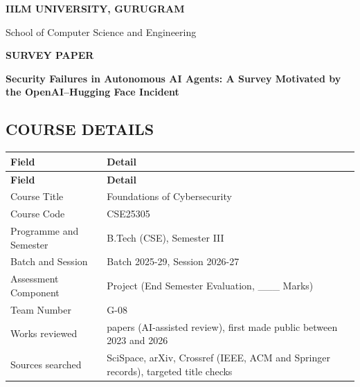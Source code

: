 \begin{center}
{\large\bfseries IILM UNIVERSITY, GURUGRAM}\par
School of Computer Science and Engineering\par\vspace{7mm}
{\Large\bfseries SURVEY PAPER}\par\vspace{6mm}
{\fontsize{18}{20}\selectfont\bfseries Security Failures in Autonomous AI Agents: A Survey Motivated by the OpenAI–Hugging Face Incident\par}
\end{center}
\subsection*{COURSE DETAILS}
\begingroup
\fontsize{10}{11.5}\selectfont
\setlength{\tabcolsep}{1.4mm}
\renewcommand{\arraystretch}{1.08}
\begin{longtable}{|>{\raggedright\arraybackslash}p{45.91mm}|>{\raggedright\arraybackslash}p{118.04mm}|}
\hline
\rowcolor{navy}\color{white}\bfseries Field & \color{white}\bfseries Detail\\\hline
\endfirsthead
\hline
\rowcolor{navy}\color{white}\bfseries Field & \color{white}\bfseries Detail\\\hline
\endhead
\endfoot
\endlastfoot
Course Title & Foundations of Cybersecurity\\\hline
Course Code & CSE25305\\\hline
Programme and Semester & B.Tech (CSE), Semester III\\\hline
Batch and Session & Batch 2025-29, Session 2026-27\\\hline
Assessment Component & Project (End Semester Evaluation, \_\_\_ Marks)\\\hline
Team Number & G-08\\\hline
Works reviewed & 35 papers (AI-assisted review), first made public between 2023 and 2026\\\hline
Sources searched & SciSpace, arXiv, Crossref (IEEE, ACM and Springer records), targeted title checks\\\hline
\end{longtable}
\endgroup

